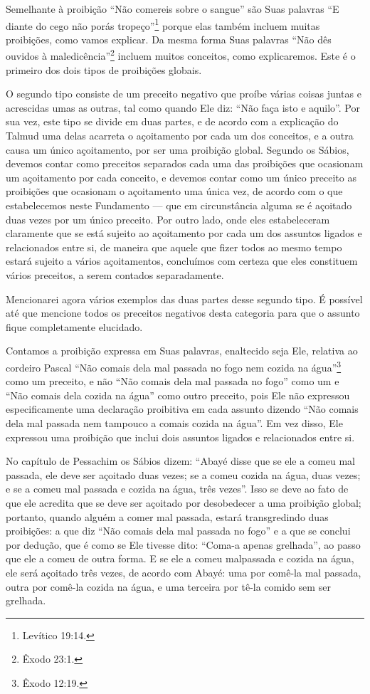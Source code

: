 Semelhante à proibição ``Não comereis sobre o sangue'' são Suas
palavras ``E diante do cego não porás tropeço''\footnote{Levítico 19:14.} porque
elas também incluem muitas proibições, como vamos explicar. Da mesma
forma Suas palavras ``Não dês ouvidos à maledicência''\footnote{Êxodo 23:1.}
incluem muitos conceitos, como explicaremos. Este é o primeiro dos dois
tipos de proibições globais.

O segundo tipo consiste de um preceito negativo que proíbe várias coisas
juntas e acrescidas umas as outras, tal como quando Ele diz: ``Não faça
isto e aquilo''. Por sua vez, este tipo se divide em duas partes, e de
acordo com a explicação do Talmud uma delas acarreta o açoitamento por
cada um dos conceitos, e a outra causa um único açoitamento, por ser
uma proibição global. Segundo os Sábios, devemos contar como preceitos
separados cada uma das proibições que ocasionam um açoitamento por cada
conceito, e devemos contar como um único preceito as proibições que
ocasionam o açoitamento uma única vez, de acordo com o que estabelecemos
neste Fundamento --- que em circunstância alguma se é açoitado duas
vezes por um único preceito. Por outro lado, onde eles estabeleceram
claramente que se está sujeito ao açoitamento por cada um dos assuntos
ligados e relacionados entre si, de maneira que aquele que fizer todos
ao mesmo tempo estará sujeito a vários açoitamentos, concluímos com
certeza que eles constituem vários preceitos, a serem contados
separadamente.

Mencionarei agora vários exemplos das duas partes desse segundo tipo. É
possível até que mencione todos os preceitos negativos desta categoria
para que o assunto fique completamente elucidado.

Contamos a proibição expressa em Suas palavras, enaltecido seja Ele,
relativa ao cordeiro Pascal ``Não comais dela mal passada no fogo nem
cozida na água''\footnote{Êxodo 12:19.} como um preceito, e não ``Não comais dela
mal passada no fogo'' como um e ``Não comais dela cozida na água'' como
outro preceito, pois Ele não expressou especificamente uma declaração
proibitiva em cada assunto dizendo ``Não comais dela mal passada nem
tampouco a comais cozida na água''. Em vez disso, Ele expressou uma
proibição que inclui dois assuntos ligados e relacionados entre si.

No capítulo de Pessachim os Sábios dizem: ``Abayé disse que se ele a
comeu mal passada, ele deve ser açoitado duas vezes; se a comeu cozida
na água, duas vezes; e se a comeu mal passada e cozida na água, três
vezes''. Isso se deve ao fato de que ele acredita que se deve ser
açoitado por desobedecer a uma proibição global; portanto, quando alguém
a comer mal passada, estará transgredindo duas proibições: a que diz
``Não comais dela mal passada no fogo'' e a que se conclui por dedução,
que é como se Ele tivesse dito: ``Coma-a apenas grelhada'', ao passo que
ele a comeu de outra forma. E se ele a comeu malpassada e cozida na
água, ele será açoitado três vezes, de acordo com Abayé: uma por
comê-la mal passada, outra por comê-la cozida na água, e uma terceira
por tê-la comido sem ser grelhada.

